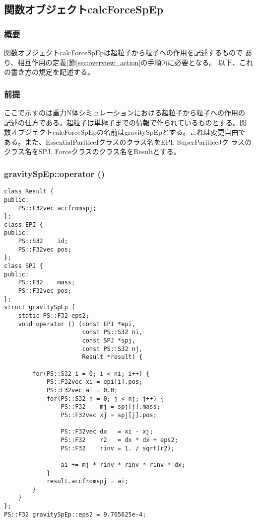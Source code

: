 \subsection{関数オブジェクトcalcForceSpEp}
\label{sec:example_userdefined_calcForceSpEp}

\subsubsection{概要}

関数オブジェクトcalcForceSpEpは超粒子から粒子への作用を記述するもので
あり、相互作用の定義(節\ref{sec:overview_action}の手順0)に必要となる。
以下、これの書き方の規定を記述する。

\subsubsection{前提}

ここで示すのは重力N体シミュレーションにおける超粒子から粒子への作用の
記述の仕方である。超粒子は単極子までの情報で作られているものとする。関
数オブジェクトcalcForceSpEpの名前はgravitySpEpとする。これは変更自由で
ある。また、EssentialParitlceIクラスのクラス名をEPI, SuperParitlceJク
ラスのクラス名をSPJ, Forceクラスのクラス名をResultとする。

\subsubsection{gravitySpEp::operator ()}

\begin{lstlisting}[caption=calcForceSpEp]
class Result {
public:
    PS::F32vec accfromspj;
};
class EPI {
public:
    PS::S32    id;
    PS::F32vec pos;
};
class SPJ {
public:
    PS::F32    mass;
    PS::F32vec pos;
};
struct gravitySpEp {
    static PS::F32 eps2;
    void operator () (const EPI *epi,
                      const PS::S32 ni,
                      const SPJ *spj,
                      const PS::S32 nj,
                      Result *result) {
                      
        for(PS::S32 i = 0; i < ni; i++) {
            PS::F32vec xi = epi[i].pos;
            PS::F32vec ai = 0.0;
            for(PS::S32 j = 0; j < nj; j++) {
                PS::F32    mj = spj[j].mass;
                PS::F32vec xj = spj[j].pos;

                PS::F32vec dx   = xi - xj;
                PS::F32    r2   = dx * dx + eps2;
                PS::F32    rinv = 1. / sqrt(r2);

                ai += mj * rinv * rinv * rinv * dx;
            }
            result.accfromspj = ai;
        }
    }
};
PS::F32 gravitySpEp::eps2 = 9.765625e-4;
\end{lstlisting}

